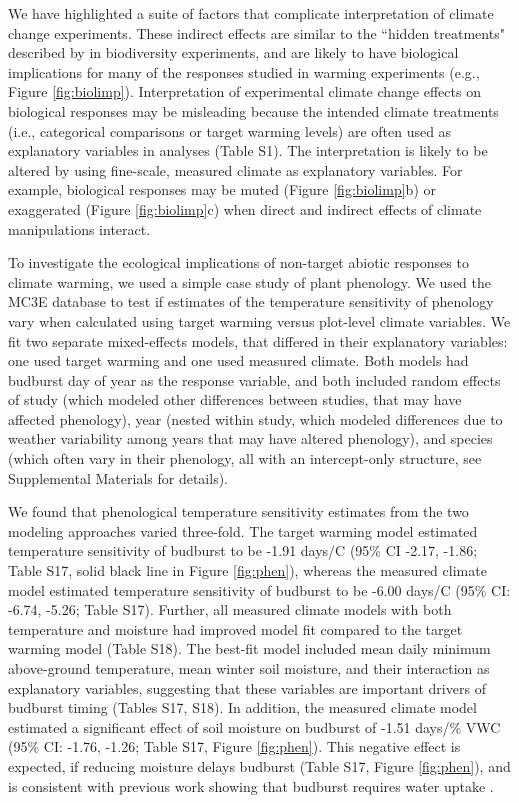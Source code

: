 \documentclass{article}
\begin{document}
\par We have highlighted a suite of factors that complicate interpretation of climate change experiments. These indirect effects are similar to the ``hidden treatments" described by \citet{huston1997} in biodiversity experiments, and are likely to have biological implications for many of the responses studied in warming experiments (e.g., Figure \ref{fig:biolimp}). Interpretation of experimental climate change effects on biological responses may be misleading because the intended climate treatments (i.e., categorical comparisons or target warming levels) are often used as explanatory variables in analyses (Table S1). The interpretation is likely to be altered by using fine-scale, measured climate as explanatory variables. For example, biological responses may be muted (Figure \ref{fig:biolimp}b) or exaggerated (Figure \ref{fig:biolimp}c) when direct and indirect effects of climate manipulations interact.

\par To investigate the ecological implications of non-target abiotic responses to climate warming, we used a simple case study of plant phenology. We used the MC3E database to test if estimates of the temperature sensitivity of phenology vary when calculated using target warming versus plot-level climate variables. We fit two separate mixed-effects models, that differed in their explanatory variables: one used target warming and one used measured climate. Both models had budburst day of year as the response variable, and both included random effects of study (which modeled other differences between studies, that may have affected phenology), year (nested within study, which modeled differences due to weather variability among years that may have altered phenology), and species (which often vary in their phenology, all with an intercept-only structure, see Supplemental Materials for details).

\par We found that phenological temperature sensitivity estimates from the two modeling approaches varied three-fold. The target warming model estimated temperature sensitivity of budburst to be -1.91 days/\degree C (95\% CI -2.17, -1.86; Table S17, solid black line in Figure \ref{fig:phen}), whereas the measured climate model estimated temperature sensitivity of budburst to be -6.00 days/\degree C (95\% CI: -6.74, -5.26; Table S17). Further, all measured climate models with both temperature and moisture had improved model fit compared to the target warming model (Table S18). The best-fit model included mean daily minimum above-ground temperature, mean winter soil moisture, and their interaction as explanatory variables, suggesting that these variables are important drivers of budburst timing (Tables S17, S18). 
In addition, the measured climate model estimated a significant effect of soil moisture on budburst of -1.51 days/\% VWC (95\% CI: -1.76, -1.26; Table S17, Figure \ref{fig:phen}). This negative effect is expected, if reducing moisture delays budburst (Table S17, Figure \ref{fig:phen}), and is consistent with previous work showing that budburst requires water uptake \citep{essiamah1986}. 
\end{document}
